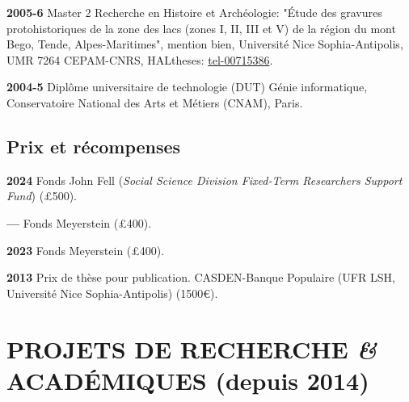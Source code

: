 \documentclass{article}
\newcommand{\fr}[1]{#1}       %
\newcommand{\en}[1]{}     %
\begin{document}
\smallbreak
\textbf{2005-6} 
\fr{Master 2 Recherche en Histoire et Archéologie: "Étude des gravures protohistoriques de la zone des lacs (zones I, II, III et V) de la région du mont Bego, Tende, Alpes-Maritimes", mention bien, Université Nice Sophia-Antipolis, UMR 7264 CEPAM-CNRS, HALtheses: \href{https://tel.archives-ouvertes.fr/tel-00715386}{tel-00715386}.}
\en{Master of Research in History and Archaeology: "Study of Protohistoric Engravings in the Lake Area (zones I, II, III, and V) of Mount Bego, Tende, Alpes-Maritimes", with honors, University of Nice Sophia-Antipolis, UMR 7264 CEPAM-CNRS, HALtheses: \href{https://tel.archives-ouvertes.fr/tel-00715386}{tel-00715386}.}

\smallbreak
\textbf{2004-5} 
\fr{Diplôme universitaire de technologie (DUT) Génie informatique, Conservatoire National des Arts et Métiers (CNAM), Paris.}
\en{University Diploma in Technology (DUT) in Computer Engineering, Conservatoire National des Arts et Métiers (CNAM), Paris.}

\subsection*{\fr{Prix et récompenses}\en{Awards and Honors}}

\textbf{2024} 
\fr{Fonds John Fell (\textit{Social Science Division Fixed-Term Researchers Support Fund}) (£500).}
\en{John Fell Fund (\textit{Social Science Division Fixed-Term Researchers Support Fund}) (£500).}
\smallbreak
\textbf{--- } 
\fr{Fonds Meyerstein (£400).}
\en{Meyerstein Fund (£400).}
\smallbreak
\textbf{2023} 
\fr{Fonds Meyerstein (£400).}
\en{Meyerstein Fund (£400).}
\smallbreak
\textbf{2013} 
\fr{Prix de thèse pour publication. CASDEN-Banque Populaire (UFR LSH, Université Nice Sophia-Antipolis) (1500€).}
\en{Dissertation Prize for Publication. CASDEN-Banque Populaire (UFR LSH, University of Nice Sophia-Antipolis) (€1500).}

\section{\fr{PROJETS DE RECHERCHE \textit{\&} ACADÉMIQUES (depuis 2014)}\en{RESEARCH \textit{\&} ACADEMIC PROJECTS (since 2014)}}
\end{document}
